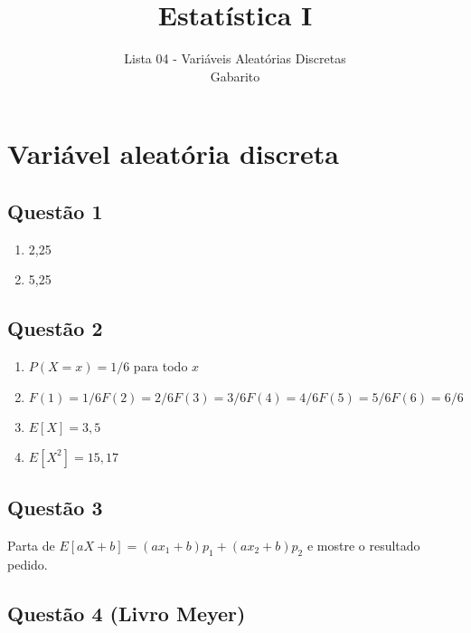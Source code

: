 \documentclass[
]{article}
\title{Estatística I}
\subtitle{Lista 04 - Variáveis Aleatórias Discretas\\
Gabarito}
\author{}
\date{\vspace{-2.5em}}
\begin{document}
\maketitle

\hypertarget{variuxe1vel-aleatuxf3ria-discreta}{%
\section{Variável aleatória
discreta}\label{variuxe1vel-aleatuxf3ria-discreta}}

\hypertarget{questuxe3o-1}{%
\subsection{Questão 1}\label{questuxe3o-1}}

\begin{enumerate}
\def\labelenumi{\alph{enumi})}
\item
  2,25
\item
  5,25
\end{enumerate}

\hypertarget{questuxe3o-2}{%
\subsection{Questão 2}\label{questuxe3o-2}}

\begin{enumerate}
\def\labelenumi{\alph{enumi})}
\item
  \(P(X=x) = 1/6\) para todo \(x\)
\item
  \(F(1) = 1/6 F(2) = 2/6 F(3) = 3/6 F(4) = 4/6 F(5) = 5/6 F(6) = 6/6\)
\item
  \(E[X] = 3,5\)
\item
  \(E[X^2] = 15,17\)
\end{enumerate}

\hypertarget{questuxe3o-3}{%
\subsection{Questão 3}\label{questuxe3o-3}}

Parta de \(E[aX+b] = (ax_1 + b)p_1 + (ax_2 + b)p_2\) e mostre o
resultado pedido.

\hypertarget{questuxe3o-4-livro-meyer}{%
\subsection{Questão 4 (Livro Meyer)}\label{questuxe3o-4-livro-meyer}}
\end{document}

